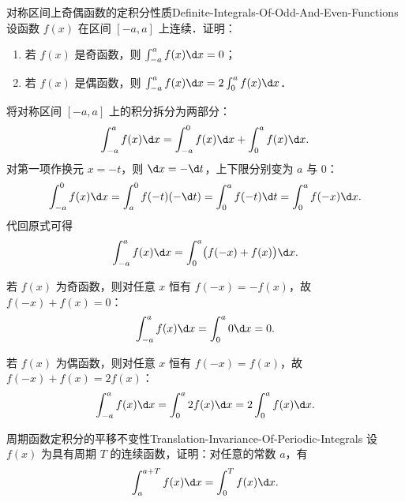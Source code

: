\begin{problem}{对称区间上奇偶函数的定积分性质}{Definite-Integrals-Of-Odd-And-Even-Functions}
    设函数 $f(x)$ 在区间 $[-a, a]$ 上连续．证明：
    \begin{enumerate}
        \item 若 $f(x)$ 是奇函数，则 $\int_{-a}^a f(x) \d x = 0$；
        \item 若 $f(x)$ 是偶函数，则 $\int_{-a}^a f(x) \d x = 2\int_0^a f(x) \d x$．
    \end{enumerate}
\end{problem}

\begin{myproof}
    将对称区间 $[-a, a]$ 上的积分拆分为两部分：
    \begin{equation}
        \int_{-a}^a f(x) \d x = \int_{-a}^0 f(x) \d x + \int_0^a f(x) \d x.
    \end{equation}
    对第一项作换元 $x = -t$，则 $\d x = -\d t$，上下限分别变为 $a$ 与 $0$：
    \begin{equation}
        \int_{-a}^0 f(x) \d x = \int_a^0 f(-t) (-\d t) = \int_0^a f(-t) \d t = \int_0^a f(-x) \d x.
    \end{equation}
    代回原式可得
    \begin{equation}
        \int_{-a}^a f(x) \d x = \int_0^a \bigl( f(-x) + f(x) \bigr) \d x.
    \end{equation}


    若 $f(x)$ 为奇函数，则对任意 $x$ 恒有 $f(-x) = -f(x)$，故 $f(-x) + f(x) = 0$：
    \begin{equation}
        \int_{-a}^a f(x) \d x = \int_0^a 0 \d x = 0.
    \end{equation}


    若 $f(x)$ 为偶函数，则对任意 $x$ 恒有 $f(-x) = f(x)$，故 $f(-x) + f(x) = 2f(x)$：
    \begin{equation}
        \int_{-a}^a f(x) \d x = \int_0^a 2f(x) \d x = 2\int_0^a f(x) \d x.
    \end{equation}
\end{myproof}

\begin{problem}{周期函数定积分的平移不变性}{Translation-Invariance-Of-Periodic-Integrals}
    设 $f(x)$ 为具有周期 $T$ 的连续函数，证明：对任意的常数 $a$，有
    \begin{equation}
        \int_a^{a+T} f(x) \d x = \int_0^T f(x) \d x.
    \end{equation}
\end{problem}

